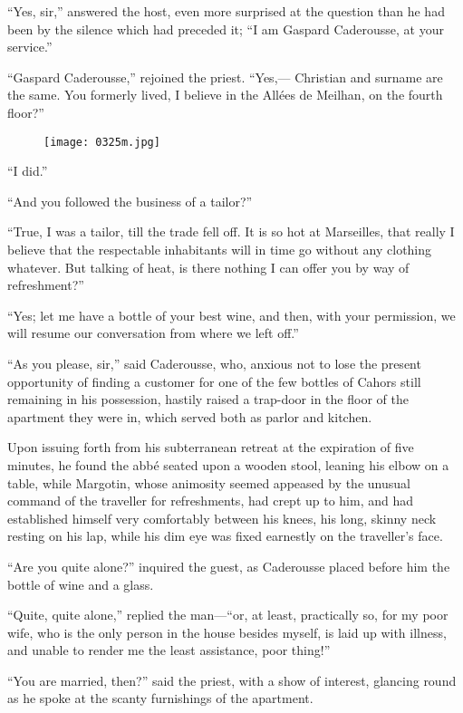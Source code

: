 “Yes, sir,” answered the host, even more surprised at the question than
he had been by the silence which had preceded it; “I am Gaspard
Caderousse, at your service.”

“Gaspard Caderousse,” rejoined the priest. “Yes,— Christian and surname
are the same. You formerly lived, I believe in the Allées de Meilhan,
on the fourth floor?”

\begin{figure}[ht]
\texttt{[image: 0325m.jpg]}
\end{figure}

“I did.”

“And you followed the business of a tailor?”

“True, I was a tailor, till the trade fell off. It is so hot at
Marseilles, that really I believe that the respectable inhabitants will
in time go without any clothing whatever. But talking of heat, is there
nothing I can offer you by way of refreshment?”

“Yes; let me have a bottle of your best wine, and then, with your
permission, we will resume our conversation from where we left off.”

“As you please, sir,” said Caderousse, who, anxious not to lose the
present opportunity of finding a customer for one of the few bottles of
Cahors still remaining in his possession, hastily raised a trap-door in
the floor of the apartment they were in, which served both as parlor
and kitchen.

Upon issuing forth from his subterranean retreat at the expiration of
five minutes, he found the abbé seated upon a wooden stool, leaning his
elbow on a table, while Margotin, whose animosity seemed appeased by
the unusual command of the traveller for refreshments, had crept up to
him, and had established himself very comfortably between his knees,
his long, skinny neck resting on his lap, while his dim eye was fixed
earnestly on the traveller’s face.

“Are you quite alone?” inquired the guest, as Caderousse placed before
him the bottle of wine and a glass.

“Quite, quite alone,” replied the man—“or, at least, practically so,
for my poor wife, who is the only person in the house besides myself,
is laid up with illness, and unable to render me the least assistance,
poor thing!”

“You are married, then?” said the priest, with a show of interest,
glancing round as he spoke at the scanty furnishings of the apartment.

